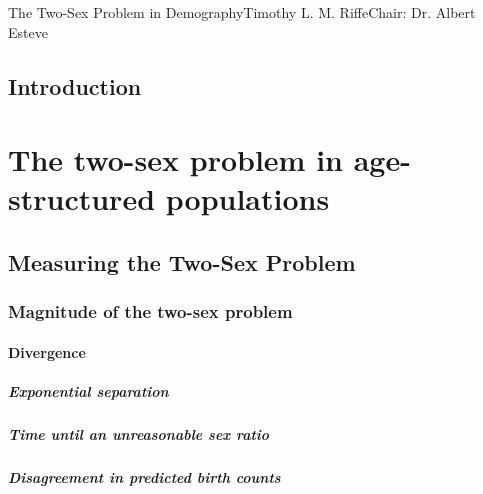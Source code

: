 \startabstractpage
{The Two-Sex Problem in Demography}{Timothy L. M. Riffe}{Chair: Dr. Albert Esteve}

\label{Abstract}

\startthechapters 
 \chapter{Introduction}
 \label{chap:Intro}
 

\part{The two-sex problem in age-structured populations}
\chapter{Measuring the Two-Sex Problem}
  
 
  \section{Magnitude of the two-sex problem}
    
    
    \subsection{Divergence}
      
      
      \subsubsection{Exponential separation}
        
      
      \subsubsection{Time until an unreasonable sex ratio}
        
      
      \subsubsection{Disagreement in predicted birth counts}
        
      

